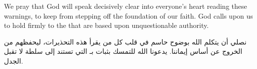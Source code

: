 We pray that God will speak decisively clear into everyone's heart reading these warnings, to keep from stepping off the foundation of our faith. God calls upon us to hold firmly to the  that are based upon unquestionable authority.


نصلي أن يتكلم الله بوضوح حاسم في قلب كل من يقرأ هذه التحذيرات، ليحفظهم من الخروج عن أساس إيماننا. يدعونا الله للتمسك بثبات بـ التي تستند إلى سلطة لا تقبل الجدل.


